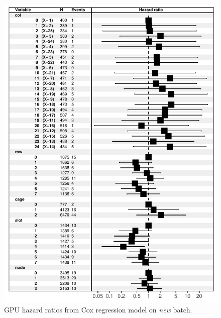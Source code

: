 \begin{figure}
  \centering
  \includegraphics[width=\columnwidth]{figs/cox_n001.pdf}
  \caption{GPU hazard ratios from Cox regression model on {\em new}
    batch.}
  \label{fig:cox-new}
\end{figure}
